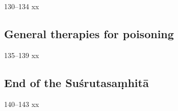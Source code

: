 \begin{translation}
 \item [130--134] xx
 
\subsection{General therapies for poisoning}

\item [135--139] xx

\subsection{End of the Suśrutasaṃhitā}

\item[140--143] xx
 
\end{translation}